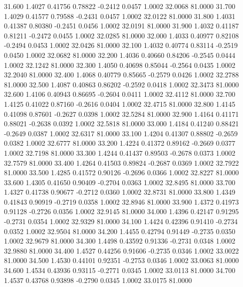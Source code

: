   31.600   1.4027   0.41756   0.78822  -0.2412   0.0457   1.0002  32.0068  81.0000
  31.700   1.4029   0.41577   0.79588  -0.2431   0.0457   1.0002  32.0122  81.0000
  31.800   1.4031   0.41387   0.80380  -0.2451   0.0456   1.0002  32.0191  81.0000
  31.900   1.4032   0.41187   0.81211  -0.2472   0.0455   1.0002  32.0285  81.0000
  32.000   1.4033   0.40977   0.82108  -0.2494   0.0453   1.0002  32.0426  81.0000
  32.100   1.4032   0.40774   0.83114  -0.2519   0.0450   1.0002  32.0682  81.0000
  32.200   1.4036   0.40660   0.84206  -0.2545   0.0444   1.0002  32.1242  81.0000
  32.300   1.4050   0.40698   0.85044  -0.2564   0.0435   1.0002  32.2040  81.0000
  32.400   1.4068   0.40779   0.85665  -0.2579   0.0426   1.0002  32.2788  81.0000
  32.500   1.4087   0.40863   0.86202  -0.2592   0.0418   1.0002  32.3473  81.0000
  32.600   1.4106   0.40943   0.86695  -0.2604   0.0411   1.0002  32.4112  81.0000
  32.700   1.4125   0.41022   0.87160  -0.2616   0.0404   1.0002  32.4715  81.0000
  32.800   1.4145   0.41098   0.87601  -0.2627   0.0398   1.0002  32.5284  81.0000
  32.900   1.4164   0.41171   0.88021  -0.2638   0.0392   1.0002  32.5818  81.0000
  33.000   1.4184   0.41240   0.88421  -0.2649   0.0387   1.0002  32.6317  81.0000
  33.100   1.4204   0.41307   0.88802  -0.2659   0.0382   1.0002  32.6777  81.0000
  33.200   1.4224   0.41372   0.89162  -0.2669   0.0377   1.0002  32.7198  81.0000
  33.300   1.4244   0.41437   0.89503  -0.2678   0.0373   1.0002  32.7579  81.0000
  33.400   1.4264   0.41503   0.89824  -0.2687   0.0369   1.0002  32.7922  81.0000
  33.500   1.4285   0.41572   0.90126  -0.2696   0.0366   1.0002  32.8227  81.0000
  33.600   1.4305   0.41650   0.90409  -0.2704   0.0363   1.0002  32.8495  81.0000
  33.700   1.4327   0.41738   0.90677  -0.2712   0.0360   1.0002  32.8731  81.0000
  33.800   1.4349   0.41843   0.90919  -0.2719   0.0358   1.0002  32.8946  81.0000
  33.900   1.4372   0.41973   0.91128  -0.2726   0.0356   1.0002  32.9145  81.0000
  34.000   1.4396   0.42147   0.91295  -0.2731   0.0354   1.0002  32.9329  81.0000
  34.100   1.4424   0.42396   0.91410  -0.2734   0.0352   1.0002  32.9504  81.0000
  34.200   1.4455   0.42794   0.91449  -0.2735   0.0350   1.0002  32.9679  81.0000
  34.300   1.4498   0.43592   0.91336  -0.2731   0.0348   1.0002  32.9880  81.0000
  34.400   1.4527   0.44256   0.91606  -0.2735   0.0346   1.0002  33.0022  81.0000
  34.500   1.4530   0.44101   0.92351  -0.2753   0.0346   1.0002  33.0063  81.0000
  34.600   1.4534   0.43936   0.93115  -0.2771   0.0345   1.0002  33.0113  81.0000
  34.700   1.4537   0.43768   0.93898  -0.2790   0.0345   1.0002  33.0175  81.0000
